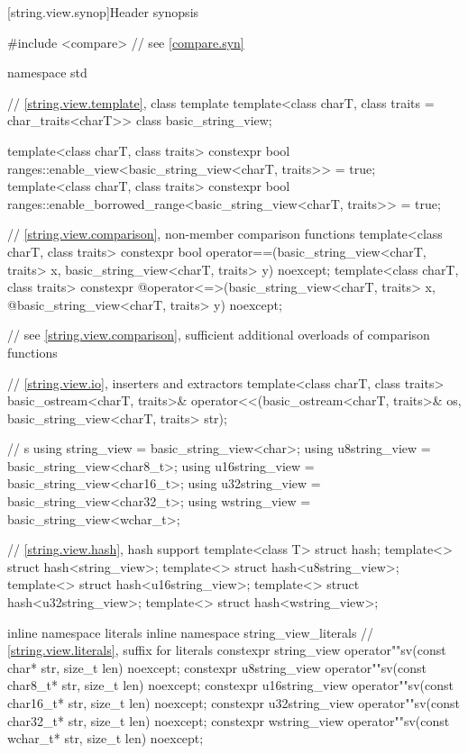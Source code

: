 [string.view.synop]{Header  synopsis}

%
\begin{codeblock}
#include <compare>              // see \ref{compare.syn}

namespace std {
  // \ref{string.view.template}, class template 
  template<class charT, class traits = char_traits<charT>>
  class basic_string_view;

  template<class charT, class traits>
    constexpr bool ranges::enable_view<basic_string_view<charT, traits>> = true;
  template<class charT, class traits>
    constexpr bool ranges::enable_borrowed_range<basic_string_view<charT, traits>> = true;

  // \ref{string.view.comparison}, non-member comparison functions
  template<class charT, class traits>
    constexpr bool operator==(basic_string_view<charT, traits> x,
                              basic_string_view<charT, traits> y) noexcept;
  template<class charT, class traits>
    constexpr @\seebelow@ operator<=>(basic_string_view<charT, traits> x,
              @\itcorr@                      basic_string_view<charT, traits> y) noexcept;

  // see \ref{string.view.comparison}, sufficient additional overloads of comparison functions

  // \ref{string.view.io}, inserters and extractors
  template<class charT, class traits>
    basic_ostream<charT, traits>&
      operator<<(basic_ostream<charT, traits>& os,
                 basic_string_view<charT, traits> str);

  //  s
  using string_view    = basic_string_view<char>;
  using u8string_view  = basic_string_view<char8_t>;
  using u16string_view = basic_string_view<char16_t>;
  using u32string_view = basic_string_view<char32_t>;
  using wstring_view   = basic_string_view<wchar_t>;

  // \ref{string.view.hash}, hash support
  template<class T> struct hash;
  template<> struct hash<string_view>;
  template<> struct hash<u8string_view>;
  template<> struct hash<u16string_view>;
  template<> struct hash<u32string_view>;
  template<> struct hash<wstring_view>;

  inline namespace literals {
  inline namespace string_view_literals {
    // \ref{string.view.literals}, suffix for  literals
    constexpr string_view    operator""sv(const char* str, size_t len) noexcept;
    constexpr u8string_view  operator""sv(const char8_t* str, size_t len) noexcept;
    constexpr u16string_view operator""sv(const char16_t* str, size_t len) noexcept;
    constexpr u32string_view operator""sv(const char32_t* str, size_t len) noexcept;
    constexpr wstring_view   operator""sv(const wchar_t* str, size_t len) noexcept;
  }
  }
}
\end{codeblock}

